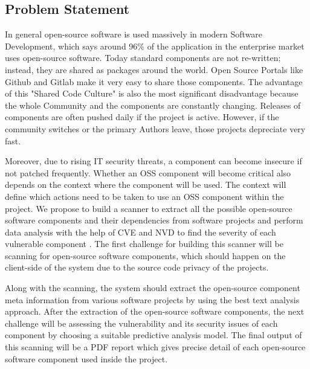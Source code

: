 \subsection{Problem Statement}
In general open-source software is used massively in modern Software Development, which says around 96\% of the application in the enterprise market uses open-source software\cite{Gilad}. Today standard components are not re-written; instead, they are shared as packages around the world. Open Source Portals like Github and Gitlab make it very easy to share those components. The advantage of this "Shared Code Culture" is also the most significant disadvantage because the whole Community and the components are constantly changing. Releases of components are often pushed daily if the project is active. However, if the community switches or the primary Authors leave, those projects depreciate very fast.

Moreover, due to rising IT security threats, a component can become insecure if not patched frequently. Whether an \acs{OSS} component will become critical also depends on the context where the component will be used. The context will define which actions need to be taken to use an \acs{OSS} component within the project. We propose to build a scanner to extract all the possible open-source software components and their dependencies from software projects and perform data analysis with the help of \acs{CVE} and \acs{NVD} to find the severity of each vulnerable component \cite{RaLo2016}. The first challenge for building this scanner will be scanning for open-source software components, which should happen on the client-side of the system due to the source code privacy of the projects.

Along with the scanning, the system should extract the open-source component meta information from various software projects by using the best text analysis approach. After the extraction of the open-source software components, the next challenge will be assessing the vulnerability and its security issues of each component by choosing a suitable predictive analysis model. The final output of this scanning will be a PDF report which gives precise detail of each open-source software component used inside the project.